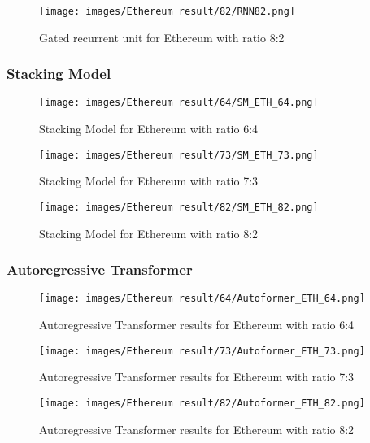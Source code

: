 \documentclass{ieeeojies}
\begin{document}
\begin{figure}[H]
  \centering
\texttt{[image: images/Ethereum result/82/RNN82.png]}\\
  \caption{Gated recurrent unit for Ethereum with ratio 8:2}
  \label{fig:rnn_eth_82}
\end{figure}


\subsubsection{Stacking Model}
\begin{figure}[H]
  \centering
\texttt{[image: images/Ethereum result/64/SM\_ETH\_64.png]}\\
  \caption{Stacking Model for Ethereum with ratio 6:4}
  \label{fig:stackmodel_eth_64}
\end{figure}

\begin{figure}[H]
  \centering
\texttt{[image: images/Ethereum result/73/SM\_ETH\_73.png]}\\
  \caption{Stacking Model for Ethereum with ratio 7:3}
  \label{fig:stackmodel_eth_73}
\end{figure}

\begin{figure}[H]
  \centering
\texttt{[image: images/Ethereum result/82/SM\_ETH\_82.png]}
  \caption{Stacking Model for Ethereum with ratio 8:2}
  \label{fig:stackmodel_eth_82}
\end{figure}


\subsubsection{Autoregressive Transformer}

\begin{figure}[H]
  \centering
\texttt{[image: images/Ethereum result/64/Autoformer\_ETH\_64.png]}
  \caption{Autoregressive Transformer results for Ethereum with ratio 6:4}
  \label{fig:autoformer_eth_64}
\end{figure}
\begin{figure}[H]
  \centering
\texttt{[image: images/Ethereum result/73/Autoformer\_ETH\_73.png]}
  \caption{Autoregressive Transformer results for Ethereum with ratio 7:3}
  \label{fig:autoformer_eth_73}
\end{figure}
\begin{figure}[H]
  \centering
\texttt{[image: images/Ethereum result/82/Autoformer\_ETH\_82.png]}
  \caption{Autoregressive Transformer results for Ethereum with ratio 8:2}
  \label{fig:autoformer_eth_82}
\end{figure}
\end{document}
